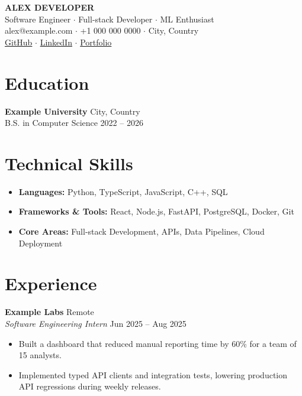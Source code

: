 \documentclass[11pt, a4paper]{article}
\begin{document}
\pagestyle{empty}

\begin{center}
    {\Huge \textbf{ALEX DEVELOPER}} \\[0.2cm]
    {\large Software Engineer \enskip $\cdot$ \enskip Full-stack Developer \enskip $\cdot$ \enskip ML Enthusiast} \\[0.15cm]
    alex@example.com \enskip $\cdot$ \enskip +1 000 000 0000 \enskip $\cdot$ \enskip City, Country \\[0.1cm]
    \href{https://github.com/example}{GitHub} \enskip $\cdot$ \enskip
    \href{https://linkedin.com/in/example}{LinkedIn} \enskip $\cdot$ \enskip
    \href{https://example.com}{Portfolio}
\end{center}

\section*{Education}
\noindent
\textbf{Example University} \hfill City, Country \\
B.S. in Computer Science \hfill 2022 -- 2026

\section*{Technical Skills}
\begin{itemize}
    \item \textbf{Languages:} Python, TypeScript, JavaScript, C++, SQL
    \item \textbf{Frameworks \& Tools:} React, Node.js, FastAPI, PostgreSQL, Docker, Git
    \item \textbf{Core Areas:} Full-stack Development, APIs, Data Pipelines, Cloud Deployment
\end{itemize}

\section*{Experience}
\noindent
\textbf{Example Labs} \hfill Remote \\
\textit{Software Engineering Intern} \hfill Jun 2025 -- Aug 2025
\begin{itemize}
    \item Built a dashboard that reduced manual reporting time by 60\% for a team of 15 analysts.
    \item Implemented typed API clients and integration tests, lowering production API regressions during weekly releases.
\end{itemize}
\end{document}
